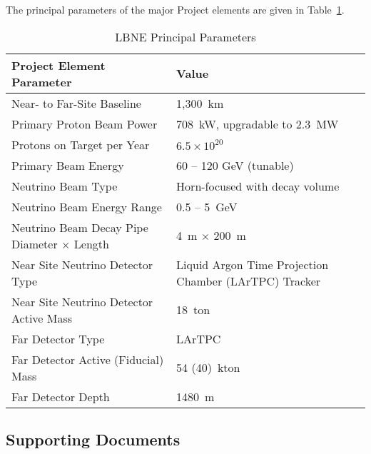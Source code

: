 The principal parameters of the major Project elements are given in Table~\ref{table:param-summ-fd}. 

\begin{table}[htpb]
\caption{LBNE Principal Parameters}
\label{table:param-summ-fd}
\centering
 \begin{tabular}[htbp]{|l|| p{6cm} |}
\hline
Project Element Parameter & Value  \\
\hline\hline
Near- to Far-Site Baseline &  1,300~km\\
\hline
Primary Proton Beam Power &  708~kW, upgradable to 2.3~MW\\
\hline
Protons on Target per Year &   $6.5 \times 10^{20}$  \\
\hline
Primary Beam Energy &  60 -- 120 GeV (tunable) \\
\hline
Neutrino Beam Type &  Horn-focused with decay volume\\
\hline
Neutrino Beam Energy Range &  0.5 -- 5~GeV \\ 
\hline
Neutrino Beam Decay Pipe Diameter $\times$ Length &  4~m $\times$ 200~m \\
\hline
Near Site Neutrino Detector Type & Liquid Argon Time Projection Chamber (LArTPC) Tracker \\
\hline
Near Site Neutrino Detector Active Mass &  18~ton \\
\hline
Far Detector Type &  LArTPC \\
\hline
Far Detector Active (Fiducial) Mass &  54 (40)~kton\\
\hline
Far Detector Depth &  1480~m \\
\hline
\end{tabular} 
\end{table}

\subsection{Supporting Documents}
\label{intro-supp-doc}

